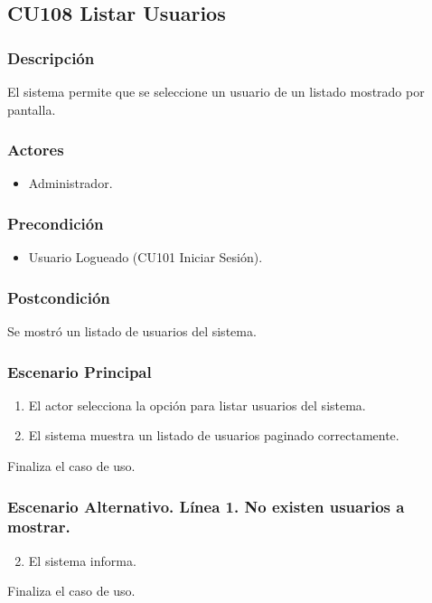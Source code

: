 \subsection{CU108 Listar Usuarios}
\subsubsection{Descripci\'{o}n}
El sistema permite que se seleccione un usuario de un listado mostrado por pantalla.
\subsubsection{Actores}
\begin{itemize}
\item Administrador.
\end{itemize}
\subsubsection{Precondici\'{o}n}
\begin{itemize}
\item Usuario Logueado (CU101 Iniciar Sesi\'{o}n).
\end{itemize}
\subsubsection{Postcondici\'{o}n}
Se mostr\'{o} un listado de usuarios del sistema.
\subsubsection{Escenario Principal}
\begin{enumerate}
\item El actor selecciona la opci\'{o}n para listar usuarios del sistema.
\item El sistema muestra un listado de usuarios paginado correctamente.
\end{enumerate}
Finaliza el caso de uso.
\subsubsection{Escenario Alternativo. L\'{i}nea 1. No existen usuarios a mostrar.}
\begin{enumerate}
\setcounter{enumi}{1}
\item El sistema informa.
\end{enumerate}
Finaliza el caso de uso.